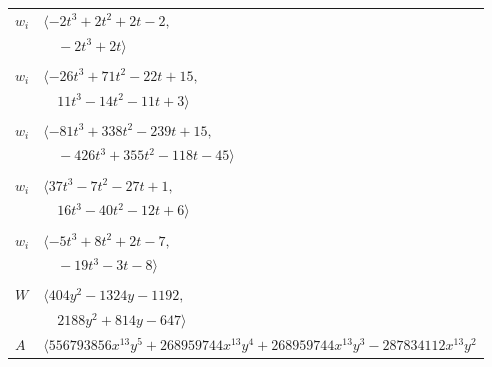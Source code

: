 \documentclass[11pt]{article}
\begin{document}
\begin{longtable}{@{}ll@{}}
$w_i$ & $\langle -2t^{3}+2t^{2}+2t-2,$\\
 & $\quad -2t^{3}+2t\rangle$\\
\addlinespace[2pt]
\multicolumn{2}{@{}p{0.97\textwidth}@{}}{$i=39$, $D_i=16$, $\rho_{ij}$: $12{:}2, \allowbreak 18{:}1, \allowbreak 29{:}2, \allowbreak 34{:}1, \allowbreak 36{:}2, \allowbreak 44{:}2, \allowbreak 45{:}1, \allowbreak 49{:}1, \allowbreak 54{:}2$}\\
$w_i$ & $\langle -26t^{3}+71t^{2}-22t+15,$\\
 & $\quad 11t^{3}-14t^{2}-11t+3\rangle$\\
\addlinespace[2pt]
\multicolumn{2}{@{}p{0.97\textwidth}@{}}{$i=40$, $D_i=16$, $\rho_{ij}$: $5{:}2, \allowbreak 13{:}1, \allowbreak 21{:}2, \allowbreak 28{:}2, \allowbreak 41{:}2, \allowbreak 42{:}1, \allowbreak 43{:}1, \allowbreak 44{:}1, \allowbreak 46{:}1, \allowbreak 50{:}1, \allowbreak 51{:}2$}\\
$w_i$ & $\langle -81t^{3}+338t^{2}-239t+15,$\\
 & $\quad -426t^{3}+355t^{2}-118t-45\rangle$\\
\addlinespace[2pt]
\multicolumn{2}{@{}p{0.97\textwidth}@{}}{$i=41$, $D_i=2$, $\rho_{ij}$: $15{:}1, \allowbreak 19{:}2, \allowbreak 22{:}1, \allowbreak 24{:}1, \allowbreak 29{:}1, \allowbreak 34{:}1, \allowbreak 40{:}1, \allowbreak 44{:}2, \allowbreak 47{:}2, \allowbreak 60{:}1$}\\
$w_i$ & $\langle 37t^{3}-7t^{2}-27t+1,$\\
 & $\quad 16t^{3}-40t^{2}-12t+6\rangle$\\
\addlinespace[2pt]
\multicolumn{2}{@{}p{0.97\textwidth}@{}}{$i=42$, $D_i=4$, $\rho_{ij}$: $12{:}1, \allowbreak 15{:}2, \allowbreak 22{:}2, \allowbreak 31{:}2, \allowbreak 38{:}1, \allowbreak 40{:}2, \allowbreak 48{:}2$}\\
$w_i$ & $\langle -5t^{3}+8t^{2}+2t-7,$\\
 & $\quad -19t^{3}-3t-8\rangle$\\
\addlinespace[2pt]
\multicolumn{2}{@{}p{0.97\textwidth}@{}}{$i=43$, $D_i=64$, $\rho_{ij}$: $0{:}2, \allowbreak 2{:}2, \allowbreak 5{:}1, \allowbreak 7{:}1, \allowbreak 8{:}2, \allowbreak 11{:}2, \allowbreak 14{:}2, \allowbreak 33{:}1, \allowbreak 34{:}1, \allowbreak 36{:}2, \allowbreak 37{:}1, \allowbreak 40{:}2, \allowbreak 50{:}1$}\\
$W$ & $\langle 404y^{2}-1324y-1192,$\\
 & $\quad 2188y^{2}+814y-647\rangle$\\
$A$ & $\langle 556793856x^{13}y^{5}+268959744x^{13}y^{4}+268959744x^{13}y^{3}-287834112x^{13}y^{2}$\\

\end{longtable}
\end{document}
